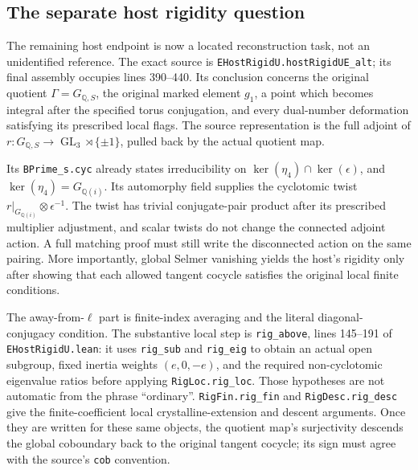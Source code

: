 \documentclass[11pt,a4paper]{article}
\numberwithin{equation}{section}
\theoremstyle{remark}\newtheorem{remark}[theorem]{Remark}
\begin{document}
\subsection{The separate host rigidity question}

The remaining host endpoint is now a located reconstruction task,
not an unidentified reference.  The exact source is
\texttt{EHost\allowbreak Rigid\allowbreak U.\allowbreak host\allowbreak Rigid\allowbreak UE\_\allowbreak alt}; its final assembly occupies
lines 390--440.  Its conclusion concerns the original quotient
$\Gamma=G_{\mathbb Q,\allowbreak{} S}$, the original marked element $g_1$, a point
which becomes integral after the specified torus conjugation, and
every dual-number deformation satisfying its prescribed local flags.
The source representation is the full adjoint of
$r:G_{\mathbb Q,\allowbreak{} S}\to\operatorname{GL}_3\rtimes\{\pm1\}$, pulled
back by the actual quotient map.

Its \texttt{BPrime\_\allowbreak s.\allowbreak cyc} already states irreducibility on
$\ker(\eta_4)\cap\ker(\epsilon)$, and
$\ker(\eta_4)=G_{\mathbb Q(i)}$.  Its automorphy field supplies the
cyclotomic twist $r|_{G_{\mathbb Q(i)}}\otimes\epsilon^{-1}$.
The twist has trivial conjugate-pair product after its prescribed
multiplier adjustment, and scalar twists do not change the connected
adjoint action.  A full matching proof must still write the
disconnected action on the same pairing.  More importantly, global
Selmer vanishing yields the host's rigidity only after showing that
each allowed tangent cocycle satisfies the original local finite
conditions.

The away-from-$\ell$ part is finite-index averaging and the literal
diagonal-conjugacy condition.  The substantive local step is
\texttt{rig\_\allowbreak above}, lines 145--191 of \texttt{EHost\allowbreak Rigid\allowbreak U.\allowbreak lean}:
it uses \texttt{rig\_\allowbreak sub} and \texttt{rig\_\allowbreak eig} to obtain an actual
open subgroup, fixed inertia weights $(e,0,-e)$, and the required
non-cyclotomic eigenvalue ratios before applying
\texttt{Rig\allowbreak Loc.\allowbreak rig\_\allowbreak loc}.  Those hypotheses are not automatic from
the phrase ``ordinary''.  \texttt{Rig\allowbreak Fin.\allowbreak rig\_\allowbreak fin} and
\texttt{Rig\allowbreak Desc.\allowbreak rig\_\allowbreak desc} give the finite-coefficient local
crystalline-extension and descent arguments.  Once they are written
for these same objects, the quotient map's surjectivity descends the
global coboundary back to the original tangent cocycle; its sign must
agree with the source's \texttt{cob} convention.
\end{document}
